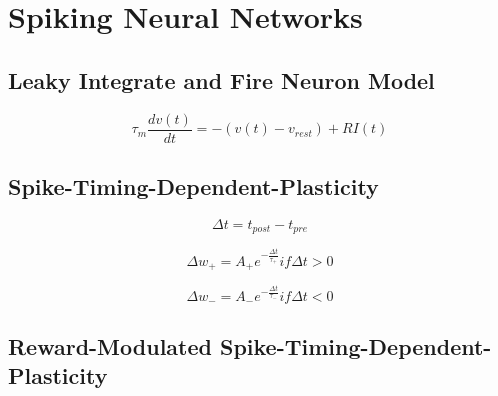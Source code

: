 \chapter{Spiking Neural Networks}
\label{section:snn}

\section{Leaky Integrate and Fire Neuron Model}

\[	
	\tau_m \frac{dv \left( t \right)}{dt} = - \left( v \left( t \right) - v_{rest} \right) + RI \left( t \right)
\]

\section{Spike-Timing-Dependent-Plasticity}

\[ \Delta t = t_{post} - t_{pre} \]

\[ \Delta w_+ = A_+ e^{- \frac{\Delta t}{\tau_+}} if \Delta t > 0  \]

\[ \Delta w_- = A_- e^{- \frac{\Delta t}{\tau_-}} if \Delta t < 0  \]

\section{Reward-Modulated Spike-Timing-Dependent-Plasticity}
